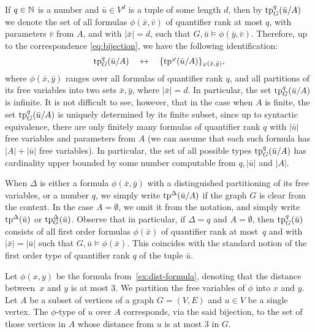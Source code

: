 If $q\in \mathbb{N}$ is a number and $\bar u\in  V^{d}$
is a tuple of some length $d$, then by $\mathrm{tp}^q_G(\bar u/A)$  we denote the set of all formulas $\phi(\bar x,\bar v)$
of quantifier rank at most $q$, with parameters $\bar v$ from $A$, and with $|\bar x|=d$,
such that $G,\bar u\models \phi(\bar y,\bar v)$.
Therefore, up to the correspondence \eqref{eq:bijection}, we have the following identification:
\begin{equation*}
\mathrm{tp}^q_G(\bar u/A)\quad\leftrightarrow\quad\{\mathrm{tp}^\varphi(\bar u/A)\}_{\varphi(\bar x,\bar y)},
\end{equation*}
where $\phi(\bar x,\bar y)$ ranges over all formulas of quantifier rank $q$, and all partitions of its free variables into two sets $\bar x,\bar y$,
where $|\bar x|=d$. 
In particular, the set $\mathrm{tp}^q_G(\bar u/A)$ is infinite.
It is not difficult to see, however, that in the case when $A$ is finite,
the set $\mathrm{tp}^q_G(\bar u/A)$ is uniquely determined by its finite subset, since up to syntactic equivalence, 
there are only finitely many formulas of quantifier rank $q$ with $|\bar u|$ free variables and parameters from $A$
(we can assume that each such formula has $|A|+|\bar u|$ free variables).
In particular, the set of all possible types 
$\mathrm{tp}^q_G(\bar u/A)$ has cardinality upper bounded by some number 
 computable from $q,|\bar u|$ and $|A|$.

When $\Delta$ is either a formula $\phi(\bar x,\bar y)$ with a distinguished partitioning of its free variables, or a number $q$,
we simply write $\mathrm{tp}^\Delta(\bar u/A)$ if the graph $G$
is clear from the context.
In the case $A=\emptyset$, we omit it from the notation, 
and simply write $\mathrm{tp}^\Delta(\bar u)$ or $\mathrm{tp}^\Delta_G(\bar u)$.
Observe that in particular, if $\Delta=q$ and $A=\emptyset$, then $\mathrm{tp}^q_G(\bar u)$ consists of all first order formulas $\phi(\bar x)$ of quantifier rank at most~$q$ and with $|\bar x|=|\bar u|$
such that $G,\bar u\models \phi(\bar x)$. This coincides with the standard notion of the first order type of quantifier rank $q$ of the tuple $\bar u$.

\begin{example}
Let $\phi(x,y)$	be the formula from~\cref{ex:dist-formula}, denoting that the distance between~$x$ and $y$ is at most $3$.
We  partition  the free variables of $\phi$
into $x$ and $y$.
Let $A$ be a subset of vertices of a graph $G=(V,E)$
and $u\in V$ be a single vertex.
The $\phi$-type of $u$ over $A$
corresponds, via the said bijection, to the set of those vertices in $A$
whose distance from $u$ is at most $3$ in $G$.
\end{example}

